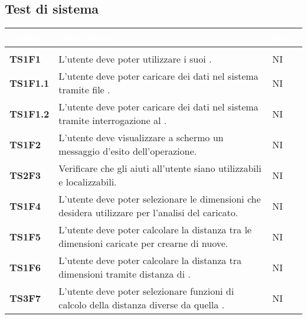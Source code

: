 \subsection{Test di sistema}

{
\renewcommand{\arraystretch}{1.5}
\renewcommand\extrarowheight{1.5pt}
\setlength\arrayrulewidth{1pt}
\begin{longtable}{ C{2cm} | C{12cm}| C{1.5cm} } 
		\textcolor{white}{\textbf{Codice}} & 
		\textcolor{white}{\textbf{Descrizione}} & 
		\textcolor{white}{\textbf{Stato}} \\
		\endfirsthead
		\\
	    \endfoot
	    \endlastfoot

\textbf{TS1F1} & 
L'utente deve poter utilizzare i suoi . & 
NI\\

\textbf{TS1F1.1} & 
L'utente deve poter caricare dei dati nel sistema tramite file . & 
NI\\

\textbf{TS1F1.2} & 
L'utente deve poter caricare dei dati nel sistema tramite interrogazione al . & 
NI\\

\textbf{TS1F2} & 
L'utente deve visualizzare a schermo un messaggio d'esito dell'operazione. & 
NI\\
		
\textbf{TS2F3} & 
Verificare che gli aiuti all'utente siano utilizzabili e localizzabili. & 
NI\\		

\textbf{TS1F4} & 
L'utente deve poter selezionare le dimensioni che desidera utilizzare per l'analisi del  caricato. & 
NI\\	

\textbf{TS1F5} & 
L'utente deve poter calcolare la distanza tra le dimensioni caricate per crearne di nuove. & 
NI\\	

\textbf{TS1F6} & 
L'utente deve poter calcolare la distanza tra dimensioni tramite distanza di \textit{}. & 
NI\\

\textbf{TS3F7} & 
L'utente deve poter selezionare funzioni di calcolo della distanza diverse da quella . & 
NI\\	


\end{longtable}}
